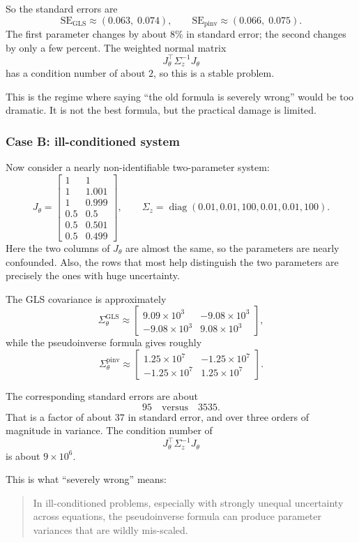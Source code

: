 \documentclass[11pt]{article}
\begin{document}
So the standard errors are
\[
\mathrm{SE}_{\mathrm{GLS}} \approx (0.063,\;0.074),
\qquad
\mathrm{SE}_{\mathrm{pinv}} \approx (0.066,\;0.075).
\]
The first parameter changes by about $8\%$ in standard error; the second changes by only a few percent. The weighted normal matrix
\[
J_\theta^\top \Sigma_z^{-1} J_\theta
\]
has a condition number of about $2$, so this is a stable problem.

This is the regime where saying ``the old formula is severely wrong'' would be too dramatic. It is not the best formula, but the practical damage is limited.

\subsubsection*{Case B: ill-conditioned system}
Now consider a nearly non-identifiable two-parameter system:
\[
J_\theta =
\begin{bmatrix}
1   & 1\\
1   & 1.001\\
1   & 0.999\\
0.5 & 0.5\\
0.5 & 0.501\\
0.5 & 0.499
\end{bmatrix},
\qquad
\Sigma_z =
\operatorname{diag}(0.01,0.01,100,0.01,0.01,100).
\]
Here the two columns of $J_\theta$ are almost the same, so the parameters are nearly confounded. Also, the rows that most help distinguish the two parameters are precisely the ones with huge uncertainty.

The GLS covariance is approximately
\[
\Sigma_\theta^{\mathrm{GLS}}
\approx
\begin{bmatrix}
9.09\times 10^{3} & -9.08\times 10^{3}\\
-9.08\times 10^{3} & 9.08\times 10^{3}
\end{bmatrix},
\]
while the pseudoinverse formula gives roughly
\[
\Sigma_\theta^{\mathrm{pinv}}
\approx
\begin{bmatrix}
1.25\times 10^{7} & -1.25\times 10^{7}\\
-1.25\times 10^{7} & 1.25\times 10^{7}
\end{bmatrix}.
\]

The corresponding standard errors are about
\[
95
\quad \text{versus} \quad
3535.
\]
That is a factor of about $37$ in standard error, and over three orders of magnitude in variance. The condition number of
\[
J_\theta^\top \Sigma_z^{-1}J_\theta
\]
is about $9\times 10^6$.

This is what ``severely wrong'' means:
\begin{quote}
In ill-conditioned problems, especially with strongly unequal uncertainty across equations, the pseudoinverse formula can produce parameter variances that are wildly mis-scaled.
\end{quote}
\end{document}
